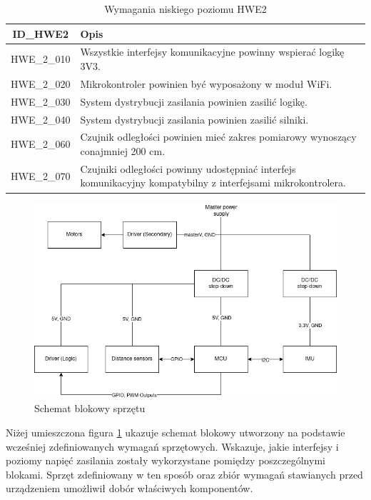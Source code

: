 \documentclass[12pt,twoside]{article}
\begin{document}
\begin{table}[ht]
\caption{Wymagania niskiego poziomu HWE2}
\centering
\begin{tabular}{|c|p{}|}	
    \hline
    ID\_HWE2 & Opis \\
    \hline
    HWE\_2\_010 & Wszystkie interfejsy komunikacyjne powinny wspierać logikę 3V3. \\
    \hline
    HWE\_2\_020 & Mikrokontroler powinien być wyposażony w moduł WiFi. \\
    \hline 
    HWE\_2\_030 & System dystrybucji zasilania powinien zasilić logikę.\\
    \hline
    HWE\_2\_040 & System dystrybucji zasilania powinien zasilić silniki. \\
    \hline
    HWE\_2\_060 & Czujnik odległości powinien mieć zakres pomiarowy wynoszący conajmniej 200 cm. \\
    \hline
    HWE\_2\_070 & Czujniki odległości powinny udostępniać interfejs komunikacyjny kompatybilny z interfejsami mikrokontrolera. \\
    \hline
\end{tabular}
\label{Tab:HWE2}
\end{table}
	

\begin{figure}[ht]%
 \centering%
 \includegraphics[width=12cm]{figures/engHW/robotblock.png}%
 \caption{Schemat blokowy sprzętu}%
 \label{Fig:schemat}%
\end{figure}

Niżej umieszczona figura \ref{Fig:schemat} ukazuje schemat blokowy utworzony na podstawie wcześniej zdefiniowanych wymagań sprzętowych. Wskazuje, jakie interfejsy i poziomy napięć zasilania zostały wykorzystane pomiędzy poszczególnymi blokami. Sprzęt zdefiniowany w ten sposób oraz zbiór wymagań stawianych przed urządzeniem umożliwił dobór właściwych komponentów.
\end{document}
